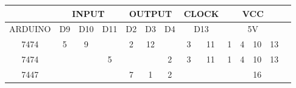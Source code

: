 \begin{tabular}{|c|c|c|c|c|c|c|c|c|c|c|c|c|c|}
\hline  & \multicolumn{3}{|c|}{INPUT} & \multicolumn{3}{|c|}{OUTPUT} & \multicolumn{2}{|c|}{CLOCK} & \multicolumn{4}{|c|}{VCC} \\
\hline ARDUINO & D9 & D10 & D11 & D2 & D3 & D4 & \multicolumn{2}{|c|}{D13} & \multicolumn{4}{|c|}{5V} \\
\hline 7474 & 5 & 9 &  & 2 & 12 & & 3 & 11 & 1 & 4 & 10 & 13 \\
\hline 7474 &  &  & 5 &  &  & 2 & 3 & 11 & 1 & 4 & 10 & 13 \\
\hline 7447 &  &  &  & 7 & 1 & 2 &  &  &  &  & 16 \\
\hline
\end{tabular}


